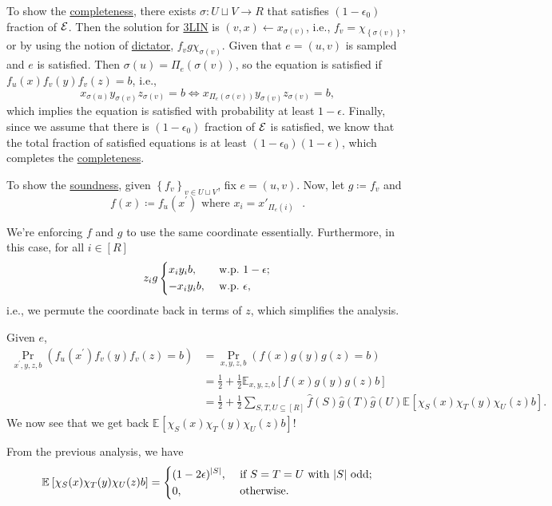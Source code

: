To show the \hyperref[def:completeness]{completeness}, there exists \(\sigma \colon U \sqcup V \to R\) that satisfies \((1 - \epsilon _0)\) fraction of \(\mathcal{\MakeUppercase{e}} \). Then the solution for \hyperref[prb:max-3LIN]{3LIN} is \((v, x) \gets x_{\sigma (v)}\), i.e., \(f_v = \chi _{\left\{ \sigma (v) \right\} }\), or by using the notion of \hyperref[not:dictation]{dictator}, \(f_v g \chi _{\sigma (v)}\). Given that \(e=(u, v)\) is sampled and \(e\) is satisfied. Then \(\sigma (u) = \Pi _e(\sigma (v))\), so the equation is satisfied if \(f_u(x) f_v(y) f_v(z) = b\), i.e.,
\[
	x_{\sigma (u)} y_{\sigma (v)} z_{\sigma (v)} = b
	\iff x_{\Pi_e (\sigma (v))} y_{\sigma (v)} z_{\sigma (v)} = b,
\]
which implies the equation is satisfied with probability at least \(1 - \epsilon\). Finally, since we assume that there is \((1-\epsilon _0)\) fraction of \(\mathcal{\MakeUppercase{e}} \) is satisfied, we know that the total fraction of satisfied equations is at least \((1-\epsilon _0) (1-\epsilon )\), which completes the \hyperref[def:completeness]{completeness}.

To show the \hyperref[def:soundness]{soundness}, given \(\left\{ f_v \right\} _{v\in U \sqcup V}\), fix \(e=(u, v)\). Now, let \(g\coloneqq f_v\) and
\[
	f(x) \coloneqq f_u(x^\prime ) \text{ where \(x_i = x'_{\Pi_e(i)}\) }.
\]
\begin{note}
	We're enforcing \(f\) and \(g\) to use the same coordinate essentially. Furthermore, in this case, for all \(i\in [R]\)
	\[
		z_i g \begin{dcases}
			x_i y_i b,  & \text{ w.p.\  } 1-\epsilon  ; \\
			-x_i y_i b, & \text{ w.p.\  } \epsilon  ,
		\end{dcases}
	\]
	i.e., we permute the coordinate back in terms of \(z\), which simplifies the analysis.
\end{note}

Given \(e\),
\[
	\begin{split}
		\Pr_{x^\prime , y, z, b}(f_u(x^\prime ) f_v(y) f_v(z) = b)
		&= \Pr_{x , y, z, b}(f(x) g(y) g(z) = b)\\
		&= \frac{1}{2} + \frac{1}{2} \mathbb{E}_{x, y, z, b}\left[f(x) g(y) g(z) b \right]\\
		&= \frac{1}{2} + \frac{1}{2} \sum_{S, T, U \subseteq [R]} \hat{f} (S) \hat{g} (T) \hat{g} (U) \mathbb{E}_{}\left[\chi _S(x) \chi _T (y) \chi _U(z) b \right].
	\end{split}
\]
We now see that we get back \(\mathbb{E}_{}\left[\chi _S(x) \chi _T (y) \chi _U(z) b \right]\)!
\begin{prev}
	From the previous analysis, we have
	\[
		\mathbb{E}_{}\left[\chi _S(x) \chi _T (y) \chi _U(z) b \right]
		= \begin{dcases}
			(1-2\epsilon )^{\vert S \vert }, & \text{ if } S=T=U \text{ with \(\vert S \vert \) odd}  ; \\
			0,                               & \text{ otherwise}  .
		\end{dcases}
	\]
\end{prev}

